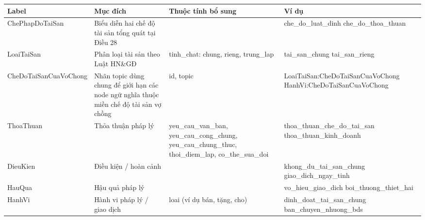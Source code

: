 \documentclass[../DoAn.tex]{subfiles}
\begin{document}
\begin{table}[htbp]
\centering
\footnotesize
\renewcommand{\arraystretch}{1.15}
\begin{tabularx}{\textwidth}{|>{\raggedright\arraybackslash}p{2.1cm}|>{\raggedright\arraybackslash}p{2.0cm}|>{\raggedright\arraybackslash}p{3.1cm}|>{\raggedright\arraybackslash}X|}
\hline
\textbf{Label} & \textbf{Mục đích} & \textbf{Thuộc tính bổ sung} & \textbf{Ví dụ} \\ \hline

ChePhapDo\-TaiSan &
Biểu diễn hai chế độ tài sản tổng quát tại Điều 28 &
&
che\_do\_luat\_dinh \newline
che\_do\_thoa\_thuan \\ \hline

LoaiTaiSan &
Phân loại tài sản theo Luật HN\&GĐ &
tinh\_\allowbreak chat: chung, rieng, trung\_\allowbreak lap &
tai\_san\_chung \newline
tai\_san\_rieng \\ \hline

CheDoTai\-SanCuaVo\-Chong &
Nhãn topic dùng chung để giới hạn các node ngữ nghĩa thuộc miền chế độ tài sản vợ chồng &
id, topic &
LoaiTaiSan:\newline CheDoTai\-SanCuaVo\-Chong \newline HanhVi:\newline CheDoTai\-SanCuaVo\-Chong \\ \hline

ThoaThuan &
Thỏa thuận pháp lý &
yeu\_\allowbreak cau\_\allowbreak van\_\allowbreak ban, yeu\_\allowbreak cau\_\allowbreak cong\_\allowbreak chung, yeu\_\allowbreak cau\_\allowbreak chung\_\allowbreak thuc, thoi\_\allowbreak diem\_\allowbreak lap, co\_\allowbreak the\_\allowbreak sua\_\allowbreak doi &
thoa\_thuan\_che\_do\_tai\_san \newline
thoa\_thuan\_kinh\_doanh \\ \hline

DieuKien &
Điều kiện / hoàn cảnh &
 &
khong\_du\_tai\_san\_chung \newline
giao\_dich\_ngay\_tinh \\ \hline

HauQua &
Hậu quả pháp lý &
 &
vo\_hieu\_giao\_dich \newline
boi\_thuong\_thiet\_hai \\ \hline

HanhVi &
Hành vi pháp lý / giao dịch &
loai (ví dụ bán, tặng, cho) &
dinh\_doat\_tai\_san\_chung \newline ban\_chuyen\_nhuong\_bds \\ \hline


\end{tabularx}
\end{table}
\end{document}
